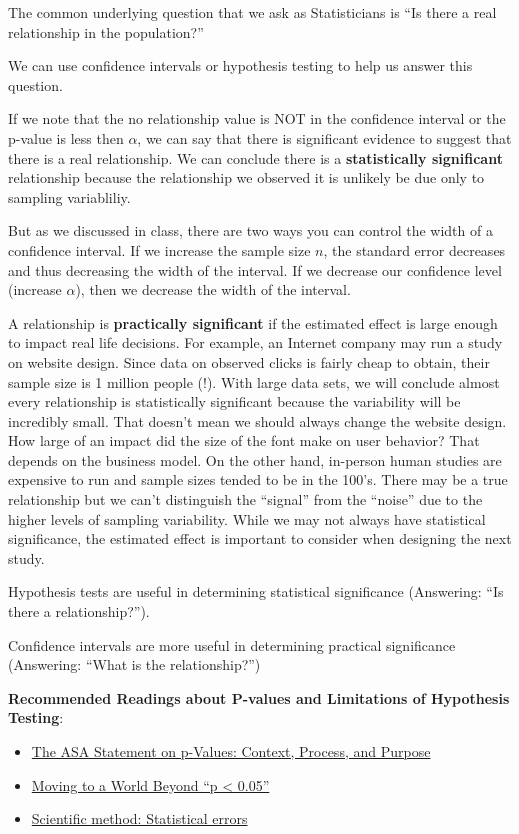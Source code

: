 \documentclass[
]{book}
\providecommand{\tightlist}{%
  \setlength{\itemsep}{0pt}\setlength{\parskip}{0pt}}
\begin{document}
The common underlying question that we ask as Statisticians is ``Is there a real relationship in the population?''

We can use confidence intervals or hypothesis testing to help us answer this question.

If we note that the no relationship value is NOT in the confidence interval or the p-value is less then \(\alpha\), we can say that there is significant evidence to suggest that there is a real relationship. We can conclude there is a \textbf{statistically significant} relationship because the relationship we observed it is unlikely be due only to sampling variabliliy.

But as we discussed in class, there are two ways you can control the width of a confidence interval. If we increase the sample size \(n\), the standard error decreases and thus decreasing the width of the interval. If we decrease our confidence level (increase \(\alpha\)), then we decrease the width of the interval.

A relationship is \textbf{practically significant} if the estimated effect is large enough to impact real life decisions. For example, an Internet company may run a study on website design. Since data on observed clicks is fairly cheap to obtain, their sample size is 1 million people (!). With large data sets, we will conclude almost every relationship is statistically significant because the variability will be incredibly small. That doesn't mean we should always change the website design. How large of an impact did the size of the font make on user behavior? That depends on the business model. On the other hand, in-person human studies are expensive to run and sample sizes tended to be in the 100's. There may be a true relationship but we can't distinguish the ``signal'' from the ``noise'' due to the higher levels of sampling variability. While we may not always have statistical significance, the estimated effect is important to consider when designing the next study.

Hypothesis tests are useful in determining statistical significance (Answering: ``Is there a relationship?'').

Confidence intervals are more useful in determining practical significance (Answering: ``What is the relationship?'')

\textbf{Recommended Readings about P-values and Limitations of Hypothesis Testing}:

\begin{itemize}
\tightlist
\item
  \href{https://www.tandfonline.com/doi/full/10.1080/00031305.2016.1154108}{The ASA Statement on p-Values: Context, Process, and Purpose}
\item
  \href{https://www.tandfonline.com/doi/full/10.1080/00031305.2019.1583913}{Moving to a World Beyond ``p \textless{} 0.05''}
\item
  \href{https://www.nature.com/news/scientific-method-statistical-errors-1.14700}{Scientific method: Statistical errors}
\end{itemize}
\end{document}
